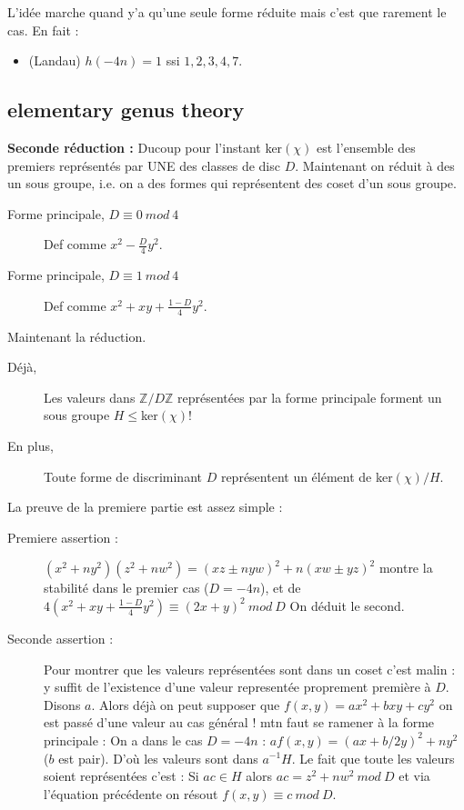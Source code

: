 \documentclass[12pt]{article}
\theoremstyle{plain}
\newcommand{\Z}{\mathbb{Z}}
\newcommand{\rg}{\color{Red}}
\begin{document}
L'idée marche quand y'a qu'une seule forme réduite mais c'est que rarement le cas. En fait :
\begin{itemize}
    \item (Landau) $h(-4n)=1$ ssi $1,2,3,4,7$.
\end{itemize}
\newpage
\subsection{elementary genus theory}

\textbf{\rg Seconde réduction :} Ducoup pour l'instant ker$(\chi)$ est l'ensemble des premiers représentés par UNE des classes de disc $D$.
Maintenant on réduit à des un sous groupe, i.e. on a des formes qui représentent des coset d'un sous groupe.

\begin{description}
    \item[\rg Forme principale, $D\equiv0~mod~4$] Def comme $x^2-\frac{D}{4}y^2$.
    \item[\rg Forme principale, $D\equiv1~mod~4$] Def comme $x^2+xy+\frac{1-D}{4}y^2$.
\end{description}

Maintenant la réduction.
\begin{description}
    \item[Déjà,] Les valeurs dans $\Z/D\Z$ représentées par la forme principale forment un sous groupe $H\leq$ker$(\chi)$! 
    \item[En plus,] Toute forme de discriminant $D$ représentent un élément de ker$(\chi)/H$.
\end{description}

La preuve de la premiere partie est assez simple :
\begin{description}
    \item[Premiere assertion :] $(x^2+ny^2)(z^2+nw^2)=(xz\pm nyw)^2+n(xw\pm yz)^2$ montre la stabilité dans le premier cas ($D=-4n$), et de $4(x^2+xy+\frac{1-D}{4}y^2)\equiv (2x+y)^2~mod~D$
On déduit le second. 
    \item[Seconde assertion :] Pour montrer que les valeurs représentées sont dans un coset c'est malin : y suffit de l'existence d'une valeur representée proprement première à $D$. Disons $a$. 
    Alors déjà on peut supposer que $f(x,y)=ax^2+bxy+cy^2$ on est passé d'une valeur au cas général ! mtn faut se ramener à la forme principale : On a dans le cas $D=-4n$ : $af(x,y)=(ax+b/2y)^2+ny^2$ ($b$ est pair). D'où
les valeurs sont dans $a^{-1}H$. Le fait que toute les valeurs soient représentées c'est : Si $ac\in H$ alors $ac=z^2+nw^2~mod~D$ et via l'équation précédente on résout $f(x,y)\equiv c~mod~D$.
\end{description}
\end{document}
